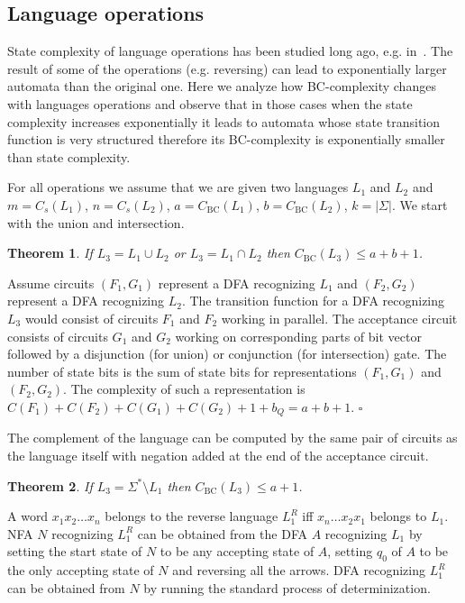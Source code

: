 \documentclass[copyright, creativecommons]{eptcs}
\newcommand{\qed}{$\square$}
\newcommand{\cBC}{C_\mathrm{BC}}
\newtheorem{theorem}{Theorem}[section]
\newenvironment{proof}[1][Proof]{\begin{trivlist}
\item[\hskip \labelsep {\bfseries #1}]}{\end{trivlist}}
\begin{document}
\subsection{Language operations}

State complexity of language operations has been studied long ago, e.g. in~\cite{SY00}. The result of some of the operations
(e.g. reversing) can lead to exponentially larger automata than the original one. Here we analyze how BC-complexity
changes with languages operations and observe that in those cases when the state complexity increases exponentially
it leads to automata whose state transition function is very structured therefore its BC-complexity is exponentially smaller
than state complexity.

For all operations we assume that we are given two languages $L_1$ and $L_2$ and $m=C_s(L_1)$,
$n=C_s(L_2)$, $a=\cBC(L_1)$, $b=\cBC(L_2)$, $k = |\Sigma|$. 
We start with the union and intersection.
\begin{theorem}
If $L_3=L_1\cup L_2$ or $L_3=L_1\cap L_2$ then $\cBC(L_3)\leq a+b+1$.
\end{theorem}
\begin{proof}
Assume circuits $(F_1, G_1)$ represent a DFA recognizing $L_1$ and $(F_2, G_2)$ represent a DFA recognizing $L_2$.
The transition function for a DFA recognizing $L_3$
would consist of circuits $F_1$ and $F_2$ working in parallel. The acceptance circuit consists of circuits $G_1$ and $G_2$
working on corresponding parts of bit vector followed by a disjunction (for union) or conjunction (for intersection) gate.
The number of state bits is the sum of state bits for representations $(F_1, G_1)$ and $(F_2, G_2)$.
The complexity of such a representation is $C(F_1)+C(F_2)+C(G_1)+C(G_2)+1+b_Q=a+b+1$.
\qed
\end{proof}

The complement of the language can be computed by the same pair of circuits as the language itself with
negation added at the end
of the acceptance circuit.
\begin{theorem}
If $L_3=\Sigma^*\setminus L_1$ then $\cBC(L_3)\leq a+1$.
\end{theorem}

A word $x_1x_2\dots x_n$ belongs to the reverse language $L_1^R$ iff $x_n\dots x_2x_1$ belongs to $L_1$.
NFA $N$ recognizing $L_1^R$ can be obtained from the DFA $A$ recognizing $L_1$ by setting the
start state of $N$ to be any accepting state of $A$, setting $q_0$ of $A$ to be the only accepting state of $N$
and reversing all the arrows.
DFA recognizing $L_1^R$ can be obtained from $N$ by running the standard process of determinization. 
\end{document}
